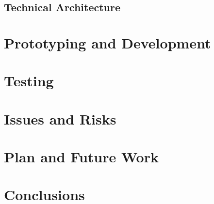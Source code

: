\documentclass[a4paper, 12pt]{article}
\begin{document}
\subsection{Technical Architecture}
\section{Prototyping and Development}
\section{Testing}
\section{Issues and Risks}
\section{Plan and Future Work}
\section{Conclusions}
\end{document}
